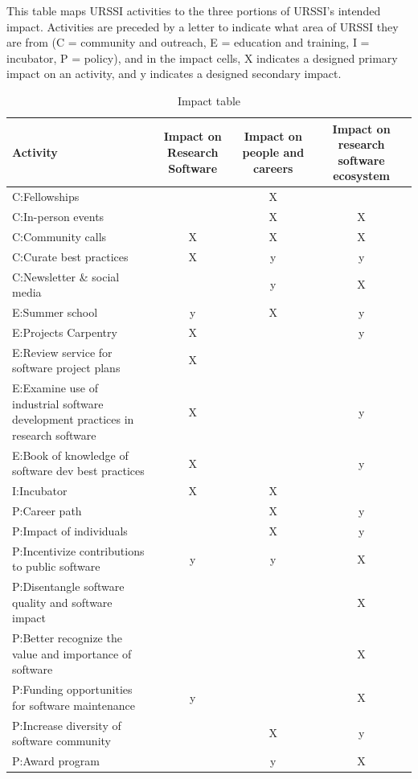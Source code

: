 \documentclass[
]{book}
\begin{document}
This table maps URSSI activities to the three portions of URSSI's intended impact. Activities are
preceded by a letter to indicate what area of URSSI they are from
(C = community and outreach,
E = education and training,
I = incubator,
P = policy),
and in the impact cells, X indicates a designed primary impact on an activity, and y indicates
a designed secondary impact.

\begin{table}

\caption{\label{tab:unnamed-chunk-5}Impact table}
\centering
\begin{tabular}[t]{lccc}
\toprule
Activity & Impact on Research Software & Impact on people and careers & Impact on research software ecosystem\\
\midrule
C:Fellowships &  & X & \\
C:In-person events &  & X & X\\
C:Community calls & X & X & X\\
C:Curate best practices & X & y & y\\
C:Newsletter \& social media &  & y & X\\
\addlinespace
E:Summer school & y & X & y\\
E:Projects Carpentry & X &  & y\\
E:Review service for software project plans & X &  & \\
E:Examine use of industrial software development practices in research software & X &  & y\\
E:Book of knowledge of software dev best practices & X &  & y\\
\addlinespace
I:Incubator & X & X & \\
P:Career path &  & X & y\\
P:Impact of individuals &  & X & y\\
P:Incentivize contributions to public software & y & y & X\\
P:Disentangle software quality and software impact &  &  & X\\
\addlinespace
P:Better recognize the value and importance of software &  &  & X\\
P:Funding opportunities for software maintenance & y &  & X\\
P:Increase diversity of software community &  & X & y\\
P:Award program &  & y & X\\
\bottomrule
\end{tabular}
\end{table}
\end{document}
